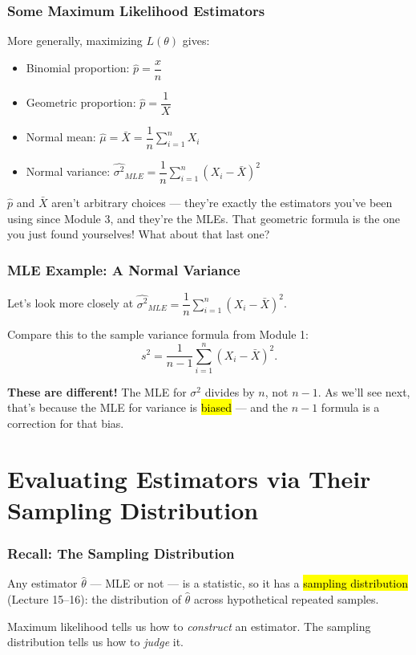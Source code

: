 \documentclass[slidestop,compress,mathserif]{beamer}
\begin{document}

\begin{frame}
    \frametitle{Some Maximum Likelihood Estimators}
    More generally, maximizing $L(\theta)$ gives:
    \smallskip
    \footnotesize
    \begin{itemize}
        \item Binomial proportion: $\hat{p} = \dfrac{x}{n}$
        \pause
        \item Geometric proportion: $\hat{p} = \dfrac{1}{X}$
        \pause
        \item Normal mean: $\hat{\mu} = \bar{X} = \dfrac{1}{n}\displaystyle\sum_{i=1}^n X_i$
        \pause
        \item Normal variance: $\widehat{\sigma^2}_{MLE} = \dfrac{1}{n}\displaystyle\sum_{i=1}^n (X_i - \bar{X})^2$
    \end{itemize}
    \pause

    \smallskip
    \normalsize
    $\hat{p}$ and $\bar{X}$ aren't arbitrary choices --- they're exactly the estimators you've been using since Module 3, and they're the MLEs. That geometric formula is the one you just found yourselves! What about that last one?
\end{frame}

\begin{frame}
    \frametitle{MLE Example: A Normal Variance}
    Let's look more closely at $\widehat{\sigma^2}_{MLE} = \dfrac{1}{n}\sum_{i=1}^n (X_i - \bar{X})^2$.
    \pause

    \medskip
    Compare this to the sample variance formula from Module 1:
    \[
    s^2 = \frac{1}{n-1}\sum_{i=1}^n (X_i - \bar{X})^2.
    \]
    \pause

    \medskip
    \textbf{These are different!} The MLE for $\sigma^2$ divides by $n$, not $n-1$. As we'll see next, that's because the MLE for variance is \hl{biased} --- and the $n-1$ formula is a correction for that bias.
\end{frame}


\section{Evaluating Estimators via Their Sampling Distribution}

\begin{frame}
    \frametitle{Recall: The Sampling Distribution}
    Any estimator $\hat{\theta}$ --- MLE or not --- is a statistic, so it has a \hl{sampling distribution} (Lecture 15--16): the distribution of $\hat{\theta}$ across hypothetical repeated samples.
    \pause

    \medskip
    Maximum likelihood tells us how to \emph{construct} an estimator. The sampling distribution tells us how to \emph{judge} it.
\end{frame}
\end{document}
